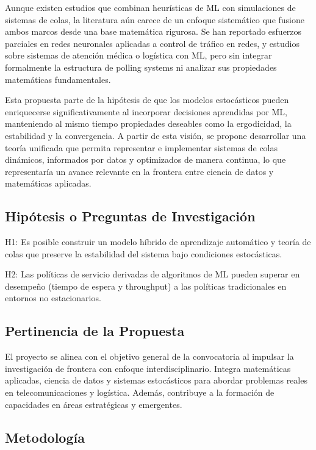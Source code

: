 \documentclass[12pt]{article}
\begin{document}
Aunque existen estudios que combinan heurísticas de ML con simulaciones de sistemas de colas, la literatura aún carece de un enfoque sistemático que fusione ambos marcos desde una base matemática rigurosa. Se han reportado esfuerzos parciales en redes neuronales aplicadas a control de tráfico en redes, y estudios sobre sistemas de atención médica o logística con ML, pero sin integrar formalmente la estructura de polling systems ni analizar sus propiedades matemáticas fundamentales.

Esta propuesta parte de la hipótesis de que los modelos estocásticos pueden enriquecerse significativamente al incorporar decisiones aprendidas por ML, manteniendo al mismo tiempo propiedades deseables como la ergodicidad, la estabilidad y la convergencia. A partir de esta visión, se propone desarrollar una teoría unificada que permita representar e implementar sistemas de colas dinámicos, informados por datos y optimizados de manera continua, lo que representaría un avance relevante en la frontera entre ciencia de datos y matemáticas aplicadas.

\subsection*{Hipótesis o Preguntas de Investigación}

H1: Es posible construir un modelo híbrido de aprendizaje automático y teoría de colas que preserve la estabilidad del sistema bajo condiciones estocásticas.

H2: Las políticas de servicio derivadas de algoritmos de ML pueden superar en desempeño (tiempo de espera y throughput) a las políticas tradicionales en entornos no estacionarios.

\subsection*{Pertinencia de la Propuesta}

El proyecto se alinea con el objetivo general de la convocatoria al impulsar la investigación de frontera con enfoque interdisciplinario. Integra matemáticas aplicadas, ciencia de datos y sistemas estocásticos para abordar problemas reales en telecomunicaciones y logística. Además, contribuye a la formación de capacidades en áreas estratégicas y emergentes.

\subsection*{Metodología}
\end{document}
